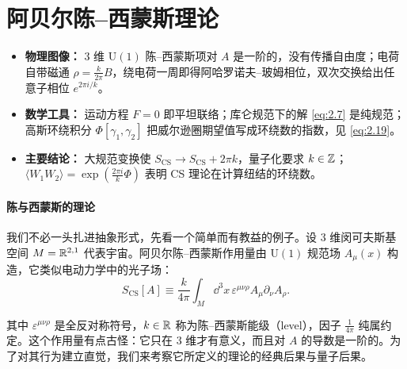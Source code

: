 
\section{阿贝尔陈--西蒙斯理论}\label{sec:2}

\begin{keytakeaways}
\begin{itemize}[leftmargin=1.4em,itemsep=2pt,topsep=2pt]
  \item \textbf{物理图像：} 3 维 $\mathrm{U}(1)$ 陈--西蒙斯项对 $A$ 是一阶的，没有传播自由度；电荷自带磁通 $\rho=\frac{k}{2\pi}B$，绕电荷一周即得阿哈罗诺夫–玻姆相位，双次交换给出任意子相位 $e^{2\pi i/k}$。
  \item \textbf{数学工具：} 运动方程 $F=0$ 即平坦联络；库仑规范下的解 \eqref{eq:2.7} 是纯规范；高斯环绕积分 $\Phi[\gamma_1,\gamma_2]$ 把威尔逊圈期望值写成环绕数的指数，见 \eqref{eq:2.19}。
  \item \textbf{主要结论：} 大规范变换使 $S_{\mathrm{CS}}\to S_{\mathrm{CS}}+2\pi k$，量子化要求 $k\in\mathbb{Z}$；$\langle W_1W_2\rangle=\exp\!\left(\frac{2\pi i}{k}\Phi\right)$ 表明 CS 理论在计算纽结的环绕数。
\end{itemize}
\end{keytakeaways}

\paragraph{陈与西蒙斯的理论} %
我们不必一头扎进抽象形式，先看一个简单而有教益的例子。设 3 维闵可夫斯基空间 $M=\mathbb{R}^{2,1}$ 代表宇宙。阿贝尔陈--西蒙斯作用量由 $\mathrm{U}(1)$ 规范场 $A_\mu(x)$ 构造，它类似电动力学中的光子场：
\begin{equation}\tag{2.1}\label{eq:2.1}
  S_{\mathrm{CS}}[A] \equiv \frac{k}{4\pi}\int_M \dd^3x\,\varepsilon^{\mu\nu\rho}A_\mu\partial_\nu A_\rho .
\end{equation}

其中 $\varepsilon^{\mu\nu\rho}$ 是全反对称符号，$k\in\mathbb{R}$ 称为陈--西蒙斯能级（level），因子 $\frac{1}{4\pi}$ 纯属约定。这个作用量有点古怪：它只在 3 维才有意义，而且对 $A$ 的导数是一阶的。为了对其行为建立直觉，我们来考察它所定义的理论的经典后果与量子后果。

